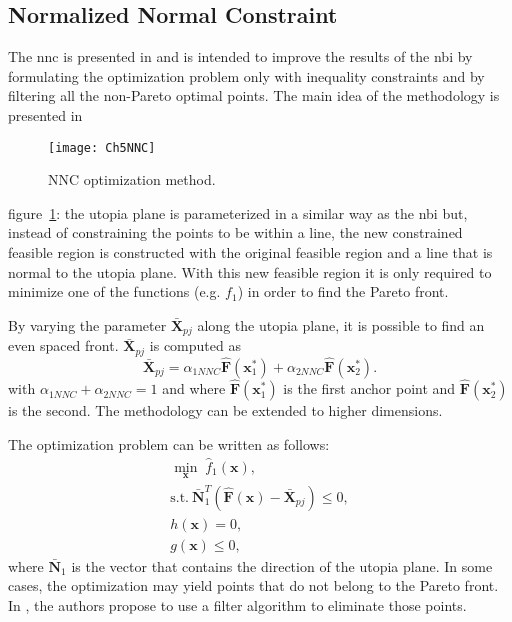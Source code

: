 \subsection{Normalized Normal Constraint}
\label{sec:NNC}
The \gls{nnc} is presented in \cite{Messac2003} and is intended to improve the results of the \gls{nbi} by formulating the optimization problem only with inequality constraints and by filtering all the non-Pareto optimal points. The main idea of the methodology is presented in
%
\begin{figure}[b]%
	\centering
	\texttt{[image: Ch5NNC]}%
	\caption{NNC optimization method.}%
	\label{fig:NNC}%
\end{figure}
%
figure~\ref{fig:NNC}: the utopia plane is parameterized in a similar way as the \gls{nbi} but, instead of constraining the points to be within a line, the new constrained feasible region is constructed with the original feasible region and a line that is normal to the utopia plane. With this new feasible region it is only required to minimize one of the functions (e.g. $f_{1}$) in order to find the Pareto front.

By varying the parameter $\bar{\mathbf{X}}_{pj}$ along the utopia plane, it is possible to find an even spaced front. $\bar{\mathbf{X}}_{pj}$ is computed as%
%
\begin{equation}
\bar{\mathbf{X}}_{pj}= \alpha_{1NNC} \mathbf{\hat{F}}(\mathbf{x}_1^*)+\alpha_{2NNC} \mathbf{\hat{F}}(\mathbf{x}_2^*).
\label{eq:Xpj}
\end{equation}%
%
with $\alpha_{1NNC}+\alpha_{2NNC}=1$ and where $\mathbf{\hat{F}}(\mathbf{x}_1^*)$ is the first anchor point and $\mathbf{\hat{F}}(\mathbf{x}_2^*)$ is the second. The methodology can be extended to higher dimensions.

The optimization problem can be written as follows:
%
\begin{equation}
\begin{gathered}
\min_{\mathbf{x}}{\; \hat{f}_{1}(\mathbf{x})}, \\
\text{s.t.} \ \bar{\mathbf{N}}_1^T \left(\hat{\mathbf{F}}(\mathbf{x})-\bar{\mathbf{X}}_{pj}\right) \leq 0,\\
h(\mathbf{x})=0, \\
g(\mathbf{x}) \leq 0,
\end{gathered}
\label{eq:NNCProblem}
\end{equation}
%
where $\bar{\mathbf{N}}_1$ is the vector that contains the direction of the utopia plane. In some cases, the optimization may yield points that do not belong to the Pareto front. In \cite{Messac2003}, the authors propose to use a filter algorithm to eliminate those points.

